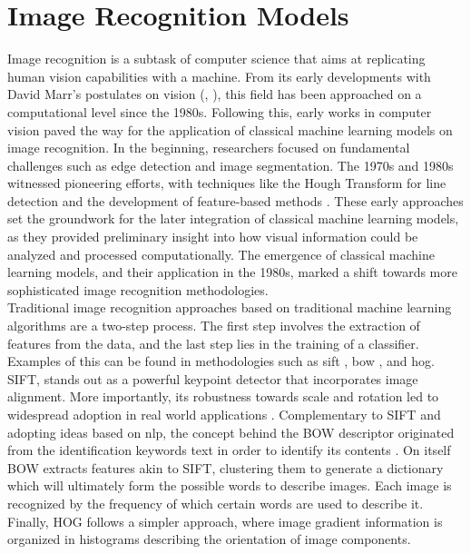 \section{Image Recognition Models}
\label{rel:sec_imrecon}
Image recognition is a subtask of computer science that aims at replicating human vision 
capabilities with a machine. From its early developments  with David Marr's postulates 
on vision (\cite{poggio1981marr}, \cite{marr2010vision}), this field has been approached on a 
computational level since the 1980s. Following this, early works in computer vision 
paved the way for the application of classical machine learning models on image recognition. In 
the beginning, researchers focused on fundamental challenges such as edge detection and image 
segmentation. The 1970s and 1980s witnessed pioneering efforts, with 
techniques like the Hough Transform for line detection and the development of feature-based 
methods \autocite{duda1972use}. These early approaches set the groundwork for the later integration 
of classical machine learning models, as they provided preliminary insight into how visual 
information could be analyzed and processed computationally. The emergence of classical machine 
learning models, and their application in the 1980s, marked a shift towards more sophisticated 
image recognition methodologies.\\

\noindent Traditional image recognition approaches based on traditional machine learning 
algorithms are a two-step process. The first step involves the extraction of features from the 
data, and the last step lies in the training of a classifier. Examples of this 
can be found in methodologies such as \gls{sift} \autocite{lowe1999object}, \gls{bow} 
\autocite{csurka2004visual}, and \gls{hog}. 
SIFT, stands out as a powerful keypoint detector that incorporates image alignment. 
More importantly, its robustness towards scale and rotation led to widespread adoption in real 
world applications \autocite{cruz2012scale}.
Complementary to SIFT and adopting ideas based on \gls{nlp}, the concept behind the BOW descriptor 
originated from the identification keywords text in order to identify its contents 
\autocite{harris1954distributional}. On itself BOW extracts features akin to SIFT, clustering them 
to generate a dictionary which will ultimately form the possible words to describe images. Each 
image is recognized by the frequency of which certain words are used to describe it.
Finally, HOG follows a simpler approach, where image gradient information is organized in histograms 
describing the orientation of image components. \\ 

